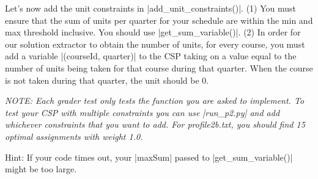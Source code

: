 \item {}
Let's now add the unit constraints in |add_unit_constraints()|. (1) You must
ensure that the sum of units per quarter for your schedule are within the min
and max threshold inclusive. You should use |get_sum_variable()|. (2) In order
for our solution extractor to obtain the number of units, for every course, you
must add a variable |(courseId, quarter)| to the CSP taking on a value equal to
the number of units being taken for that course during that quarter. When the
course is not taken during that quarter, the unit should be 0.

{\em NOTE: Each grader test only tests the function you are asked to implement.
To test your CSP with multiple constraints you can use |run_p2.py| and add
whichever constraints that you want to add. For profile2b.txt, you should find
15 optimal assignments with weight 1.0.

Hint: If your code times out, your |maxSum| passed to |get_sum_variable()| might
be too large.}
